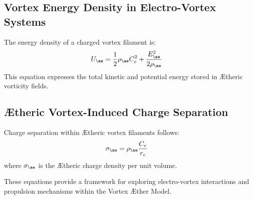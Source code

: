 \subsection{Vortex Energy Density in Electro-Vortex Systems}
The energy density of a charged vortex filament is:
\begin{equation}
    U_{\ae} = \frac{1}{2} \rho_{\ae} C_e^2 + \frac{E_{\ae}^2}{2 \rho_{\ae}}
\end{equation}
This equation expresses the total kinetic and potential energy stored in \AE theric vorticity fields.

\subsection{\AE theric Vortex-Induced Charge Separation}
Charge separation within \AE theric vortex filaments follows:
\begin{equation}
    \sigma_{\ae} = \rho_{\ae} \frac{C_e}{r_c}
\end{equation}
where $\sigma_{\ae}$ is the \AE theric charge density per unit volume.

These equations provide a framework for exploring electro-vortex interactions and propulsion mechanisms within the Vortex \AE ther Model.
